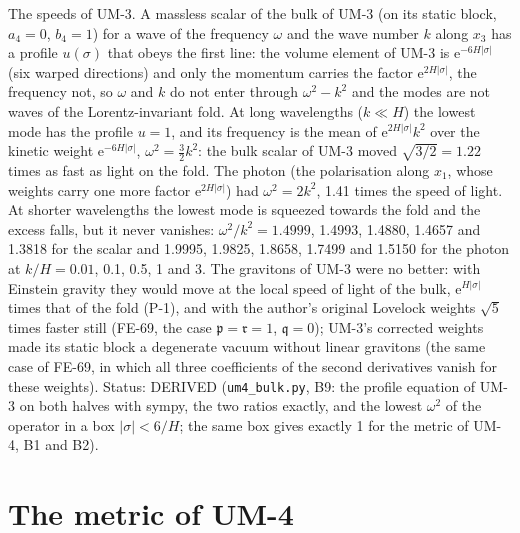 \documentclass[
  10pt,
]{article}
\begin{document}
The speeds of UM-3. A massless scalar of the bulk of UM-3 (on its static
block, \(a_4 = 0\), \(b_4 = 1\)) for a wave of the frequency \(\omega\)
and the wave number \(k\) along \(x_3\) has a profile \(u(\sigma)\) that
obeys the first line: the volume element of UM-3 is
\(\mathrm{e}^{-6H\lvert\sigma\rvert}\) (six warped directions) and only
the momentum carries the factor \(\mathrm{e}^{2H\lvert\sigma\rvert}\),
the frequency not, so \(\omega\) and \(k\) do not enter through
\(\omega^2 - k^2\) and the modes are not waves of the Lorentz-invariant
fold. At long wavelengths (\(k \ll H\)) the lowest mode has the profile
\(u = 1\), and its frequency is the mean of
\(\mathrm{e}^{2H\lvert\sigma\rvert}k^2\) over the kinetic weight
\(\mathrm{e}^{-6H\lvert\sigma\rvert}\), \(\omega^2 = \frac32k^2\): the
bulk scalar of UM-3 moved \(\sqrt{3/2} = 1.22\) times as fast as light
on the fold. The photon (the polarisation along \(x_1\), whose weights
carry one more factor \(\mathrm{e}^{2H\lvert\sigma\rvert}\)) had
\(\omega^2 = 2k^2\), 1.41 times the speed of light. At shorter
wavelengths the lowest mode is squeezed towards the fold and the excess
falls, but it never vanishes: \(\omega^2/k^2 = 1.4999\), 1.4993, 1.4880,
1.4657 and 1.3818 for the scalar and 1.9995, 1.9825, 1.8658, 1.7499 and
1.5150 for the photon at \(k/H = 0.01\), 0.1, 0.5, 1 and 3. The
gravitons of UM-3 were no better: with Einstein gravity they would move
at the local speed of light of the bulk,
\(\mathrm{e}^{H\lvert\sigma\rvert}\) times that of the fold (P-1), and
with the author's original Lovelock weights \(\sqrt5\) times faster
still (FE-69, the case \(\mathfrak{p} = \mathfrak{r} = 1\),
\(\mathfrak{q} = 0\)); UM-3's corrected weights made its static block a
degenerate vacuum without linear gravitons (the same case of FE-69, in
which all three coefficients of the second derivatives vanish for these
weights). Status: DERIVED (\texttt{um4\_bulk.py}, B9: the profile
equation of UM-3 on both halves with sympy, the two ratios exactly, and
the lowest \(\omega^2\) of the operator in a box
\(\lvert\sigma\rvert < 6/H\); the same box gives exactly 1 for the
metric of UM-4, B1 and B2).

\hypertarget{the-metric-of-um-4}{%
\section{The metric of UM-4}\label{the-metric-of-um-4}}
\end{document}
